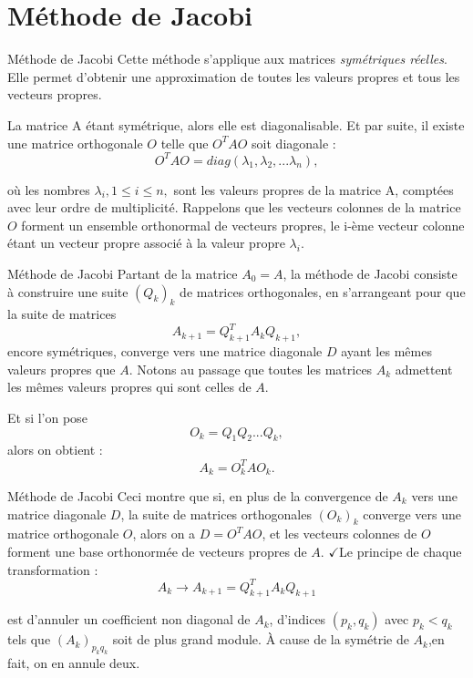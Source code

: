 \documentclass[french, 10pt]{beamer}
\theoremstyle{definition}
\begin{document}
\section{Méthode de Jacobi}
\begin{frame}{Méthode de Jacobi \cite{golub2013} \cite{takahashi2013}}
	Cette méthode s'applique aux matrices \textit{symétriques réelles}. Elle permet d'obtenir une approximation de toutes les valeurs propres et tous les vecteurs propres. 
	
	La matrice A étant symétrique, alors elle est diagonalisable. Et par suite, il existe une matrice orthogonale $O$ telle que $O^T AO$ soit diagonale :
	$$O^T AO = diag(\lambda_1, \lambda_2,...\lambda_n),$$
	
	où les nombres $\lambda_i
	, 1 \leq i \leq n,$ sont les valeurs propres de la matrice A, comptées avec
	leur ordre de multiplicité. Rappelons que les vecteurs colonnes de la matrice $O$ forment un
	ensemble orthonormal de vecteurs propres, le i-ème vecteur colonne étant un vecteur propre
	associé à la valeur propre $\lambda_i$.
\end{frame}
\begin{frame}{Méthode de Jacobi}
	Partant de la matrice $A_0 = A$, la méthode de Jacobi consiste à construire une suite $(Q_k)_k$
	de matrices orthogonales, en s’arrangeant pour que la suite de matrices
	$$A_{k+1} = Q^T
	_{k+1}A_kQ_{k+1},$$
	encore symétriques, converge vers une matrice diagonale $D$ ayant les mêmes valeurs propres
	que $A$. Notons au passage que toutes les matrices $A_k$ admettent les mêmes valeurs
	propres qui sont celles de $A$.
	
	Et si l’on pose $$O_k =Q_1Q_2...Q_k,$$
	alors on obtient :
	$$A_k =O^T_kAO_k.$$
\end{frame}
\begin{frame}{Méthode de Jacobi}
	Ceci montre que si, en plus de la convergence de $A_k$ vers une matrice diagonale $D$, la suite de
	matrices orthogonales $(O_k)_k$ converge vers une matrice orthogonale $O$, alors on a $D = O^TAO$,
	et les vecteurs colonnes de $O$ forment une base orthonormée de vecteurs propres de $A$.
	$\checkmark$Le principe de chaque transformation :
	$$ A_k \rightarrow A_{k+1}=Q^T_{k+1}A_kQ_{k+1}$$
	
	est d’annuler un coefficient non diagonal de $A_k$, d'indices $(p_k, q_k)$ avec $p_k < q_k$ tels que $(A_k)_{p_kq_k}$ soit de plus grand module.
	À cause de la symétrie de $A_k$,en fait, on en annule deux. 
\end{frame}
\end{document}

